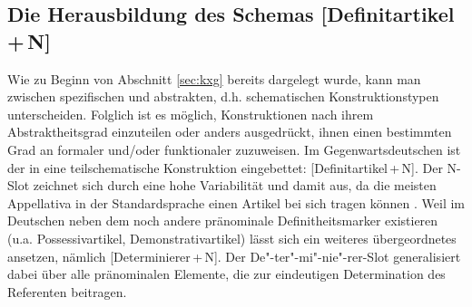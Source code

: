 \subsection{Die Herausbildung des Schemas [Definitartikel\,+\,N]}\label{sec:schema}

Wie zu Beginn von Abschnitt \ref{sec:kxg} bereits dargelegt wurde, kann man zwischen spezifischen  und abstrakten, d.h. schematischen Konstruktionstypen  unterscheiden. Folglich ist es möglich, Konstruktionen nach ihrem Abstraktheitsgrad einzuteilen oder anders ausgedrückt, ihnen einen bestimmten Grad an formaler und/\-oder funktionaler  zuzuweisen. Im Gegenwartsdeutschen ist der  in eine teilschematische Konstruktion   eingebettet: [Definitartikel\,+\,N]. Der N-Slot zeichnet sich durch eine hohe Variabilität und damit  aus, da die meisten Appellativa  in der Standardsprache einen Artikel bei sich tragen können \parencite[zu den Ausnahmen s.][]{DAvis2013}.
Weil im Deutschen neben dem  noch andere pränominale Definitheitsmarker  existieren (u.a. Possessivartikel, Demonstrativartikel)   lässt sich ein weiteres übergeordnetes  ansetzen, nämlich [Determinierer\,+\,N]. Der De"-ter"-mi"-nie"-rer-Slot generalisiert dabei über alle pränominalen Elemente, die zur eindeutigen Determination des Referenten beitragen. 



